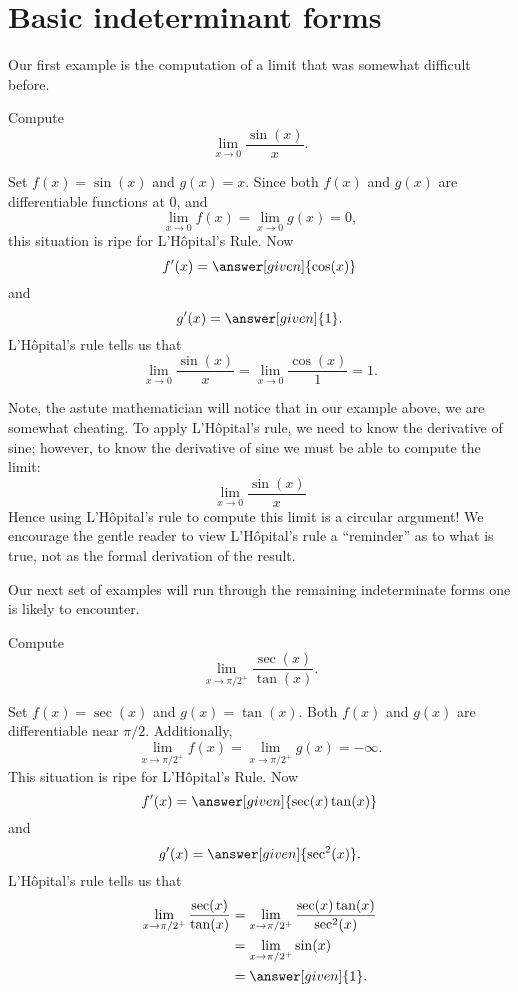 \documentclass{ximera}
\begin{document}
\section{Basic indeterminant forms}


Our first example is the computation of a limit that was somewhat
difficult before.

\begin{example}
Compute
\[
\lim_{x\to 0} \frac{\sin(x)}{x}.
\]
\begin{explanation}
Set $f(x) = \sin(x)$ and $g(x) = x$.  Since both $f(x)$ and $g(x)$ are
differentiable functions at $0$, and 
\[
\lim_{x \to 0} f(x) = \lim_{x \to 0}g(x) = 0,
\]
this situation is ripe for L'H\^{o}pital's Rule. Now
\[
f'(x) = \answer[given]{\cos(x)}
\]
and
\[
g'(x) = \answer[given]{1}.
\] 
L'H\^{o}pital's rule tells us that 
\[
\lim_{x \to 0} \frac{\sin(x)}{x} = \lim_{x \to 0} \frac{\cos(x)}{1} = 1.
\]
\end{explanation}
\end{example}

\begin{remark}
  Note, the astute mathematician will notice that in our example
  above, we are somewhat cheating. To apply L'H\^ opital's rule, we
  need to know the derivative of sine; however, to know the derivative
  of sine we must be able to compute the limit:
  \[
  \lim_{x\to 0}\frac{\sin(x)}{x}
  \]
  Hence using L'H\^{o}pital's rule to compute this limit is a circular
  argument! We encourage the gentle reader to view L'H\^{o}pital's rule
  a ``reminder'' as to what is true, not as the formal derivation of
  the result.
\end{remark}


Our next set of examples will run through the remaining indeterminate
forms one is likely to encounter.

\begin{example}
  Compute 
\[
\lim_{x\to \pi/2^+} \frac{\sec(x)}{\tan(x)}.
\]
\begin{explanation}
Set $f(x) = \sec(x)$ and $g(x) = \tan(x)$. Both $f(x)$ and $g(x)$
are differentiable near $\pi/2$. Additionally,
\[
\lim_{x \to \pi/2^+} f(x) = \lim_{x \to \pi/2^+}g(x) = -\infty.
\]
This situation is ripe for L'H\^opital's Rule. Now 
\[
f'(x) = \answer[given]{\sec(x)\tan(x)}
\]
and
\[
g'(x) = \answer[given]{\sec^2(x)}.
\]
L'H\^{o}pital's rule tells us that 
\begin{align*}
\lim_{x\to \pi/2^+} \frac{\sec(x)}{\tan(x)} &= \lim_{x\to \pi/2^+}
\frac{\sec(x)\tan(x)}{\sec^2(x)} \\
&= \lim_{x\to \pi/2^+} \sin(x)\\
&=\answer[given]{1}.
\end{align*}
\end{explanation}
\end{example}
\end{document}

